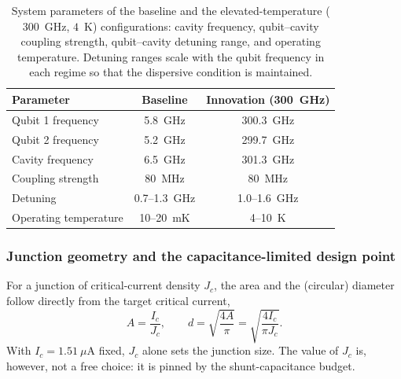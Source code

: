 \begin{table}[h]
\centering
\begin{tabular}{@{}lcc@{}}
\toprule
\textbf{Parameter} & \textbf{Baseline} & \textbf{Innovation (300~GHz)} \\
\midrule
Qubit 1 frequency & 5.8~GHz & 300.3~GHz \\
Qubit 2 frequency & 5.2~GHz & 299.7~GHz \\
Cavity frequency & 6.5~GHz & 301.3~GHz \\
Coupling strength & 80~MHz & 80~MHz \\
Detuning & 0.7--1.3~GHz & 1.0--1.6~GHz \\
Operating temperature & 10--20~mK & 4--10~K \\
\bottomrule
\end{tabular}
\caption{System parameters of the baseline and the elevated-temperature ($300$~GHz, $4$~K) configurations: cavity frequency, qubit--cavity coupling strength, qubit--cavity detuning range, and operating temperature. Detuning ranges scale with the qubit frequency in each regime so that the dispersive condition is maintained.}
\end{table}

\subsubsection{Junction geometry and the capacitance-limited design point}
\label{sec:junction_capacitance_point}

For a junction of critical-current density $J_c$, the area and the (circular) diameter follow directly from the target critical current,
\begin{equation}
A = \frac{I_c}{J_c}, \qquad d = \sqrt{\frac{4A}{\pi}} = \sqrt{\frac{4 I_c}{\pi J_c}} .
\end{equation}
With $I_c = 1.51~\mu$A fixed, $J_c$ alone sets the junction size. The value of $J_c$ is, however, not a free choice: it is pinned by the shunt-capacitance budget.

